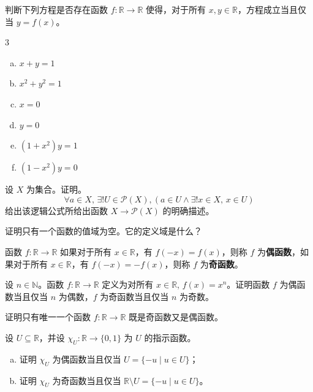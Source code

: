 \begin{chapex}
判断下列方程是否存在函数 $f : \mathbb{R} \to \mathbb{R}$ 使得，对于所有 $x,y \in \mathbb{R}$，方程成立当且仅当 $y=f(x)$。
\begin{multicols}{3}
\begin{enumerate}[(a)]
\item $x+y=1$
\item $x^2+y^2=1$
\item $x=0$
\item $y=0$
\item $(1+x^2)y=1$
\item $(1-x^2)y=0$
\end{enumerate}
\end{multicols}
\end{chapex}

\begin{chapex}
设 $X$ 为集合。证明。
\[ \forall a \in X,\, \exists ! U \in \mathcal{P}(X), (a \in U \wedge \exists ! x \in X,\, x \in U) \]
给出该逻辑公式所给出函数 $X \to \mathcal{P}(X)$ 的明确描述。
\end{chapex}

\begin{chapex}
证明只有一个函数的值域为空。它的定义域是什么？
\end{chapex}

\begin{definition}
\label{defEvenOddFunction}
函数 $f : \mathbb{R} \to \mathbb{R}$ 如果对于所有 $x \in \mathbb{R}$，有 $f(-x)=f(x)$，则称 $f$ 为\textbf{偶函数}，如果对于所有 $x \in \mathbb{R}$，有 $f(-x)=-f(x)$，则称 $f$ 为\textbf{奇函数}。
\end{definition}

\begin{chapex}
设 $n \in \mathbb{N}$。函数 $f : \mathbb{R} \to \mathbb{R}$ 定义为对所有 $x \in \mathbb{R}$, $f(x)=x^n$。证明函数 $f$ 为偶函数当且仅当 $n$ 为偶数，$f$ 为奇函数当且仅当 $n$ 为奇数。
\end{chapex}

\begin{chapex}
证明只有唯一一个函数 $f : \mathbb{R} \to \mathbb{R}$ 既是奇函数又是偶函数。
\end{chapex}

\begin{chapex}
设 $U \subseteq \mathbb{R}$，并设 $\chi_U : \mathbb{R} \to \{0,1\}$ 为 $U$ 的指示函数。
\begin{enumerate}[(a)]
\item 证明 $\chi_U$ 为偶函数当且仅当 $U = \{ -u \mid u \in U \}$；
\item 证明 $\chi_U$ 为奇函数当且仅当 $\mathbb{R} \setminus U = \{ -u \mid u \in U \}$。
\end{enumerate}
\end{chapex}

